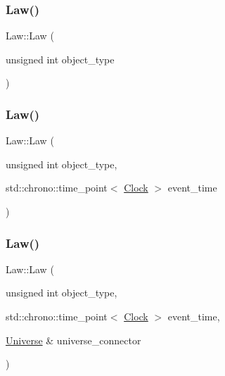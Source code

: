 \mbox{\label{classLaw_afd1730474b2806ec6665e16419f4994c}} 
\subsubsection{\texorpdfstring{Law()}{Law()}\hspace{0.1cm}{\footnotesize\ttfamily [2/4]}}
{\footnotesize\ttfamily Law\+::\+Law (\begin{DoxyParamCaption}\item[{unsigned int}]{object\+\_\+type }\end{DoxyParamCaption})\hspace{0.3cm}{\ttfamily [inline]}}

\mbox{\label{classLaw_afdc75daa3a3346c473454c7a4dc2eab5}} 
\subsubsection{\texorpdfstring{Law()}{Law()}\hspace{0.1cm}{\footnotesize\ttfamily [3/4]}}
{\footnotesize\ttfamily Law\+::\+Law (\begin{DoxyParamCaption}\item[{unsigned int}]{object\+\_\+type,  }\item[{std\+::chrono\+::time\+\_\+point$<$ \mbox{\hyperlink{universe_8h_a0ef8d951d1ca5ab3cfaf7ab4c7a6fd80}{Clock}} $>$}]{event\+\_\+time }\end{DoxyParamCaption})\hspace{0.3cm}{\ttfamily [inline]}}

\mbox{\label{classLaw_aa4fb7baf54aa77720605fd601fb80b8d}} 
\subsubsection{\texorpdfstring{Law()}{Law()}\hspace{0.1cm}{\footnotesize\ttfamily [4/4]}}
{\footnotesize\ttfamily Law\+::\+Law (\begin{DoxyParamCaption}\item[{unsigned int}]{object\+\_\+type,  }\item[{std\+::chrono\+::time\+\_\+point$<$ \mbox{\hyperlink{universe_8h_a0ef8d951d1ca5ab3cfaf7ab4c7a6fd80}{Clock}} $>$}]{event\+\_\+time,  }\item[{\mbox{\hyperlink{classUniverse}{Universe}} \&}]{universe\+\_\+connector }\end{DoxyParamCaption})\hspace{0.3cm}{\ttfamily [inline]}}

